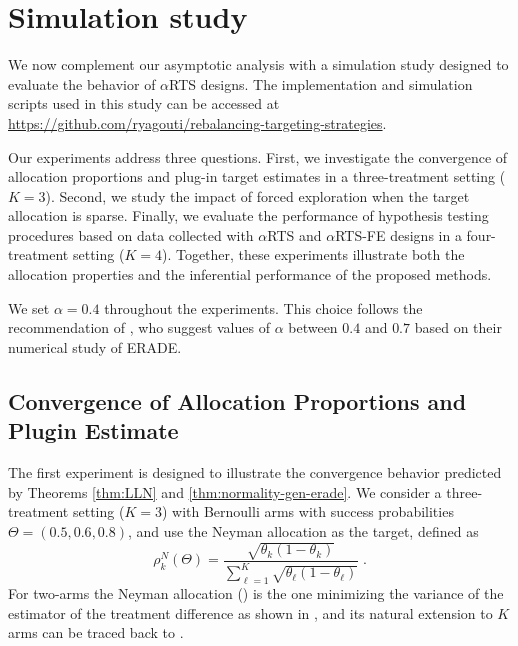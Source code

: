 \documentclass[11pt]{article}
\theoremstyle{plain}
\theoremstyle{definition}
\begin{document}
	
	\section{Simulation study}\label{sec:simulation}

We now complement our asymptotic analysis with a simulation study designed to evaluate the behavior of $\alpha$RTS designs. The implementation and simulation scripts used in this study can be accessed at \url{https://github.com/ryagouti/rebalancing-targeting-strategies}.

	Our experiments address three questions. First, we investigate the
	convergence of allocation proportions and plug-in target estimates in a
	three-treatment setting (\(K=3\)). Second, we study the impact of forced
	exploration when the target allocation is sparse. Finally, we evaluate the
	performance of hypothesis testing procedures based on data collected with
	\(\alpha\)RTS and \(\alpha\)RTS-FE designs in a four-treatment setting
	(\(K=4\)). Together, these experiments illustrate both the allocation
	properties and the inferential performance of the proposed methods.
	
	We set \(\alpha=0.4\) throughout the experiments. This choice follows the recommendation of \cite{hu2009efficient}, who suggest values of \(\alpha\) between \(0.4\) and \(0.7\)
	based on their numerical study of ERADE.

\subsection{Convergence of Allocation Proportions and Plugin Estimate}

The first experiment is designed to illustrate the convergence behavior predicted by Theorems \ref{thm:LLN} and \ref{thm:normality-gen-erade}. We consider a three-treatment setting (\(K=3\)) with Bernoulli arms with success probabilities $\Theta=(0.5, 0.6, 0.8)$, and use the Neyman allocation as the target, defined as
\[\rho_k^N(\Theta) = \frac{\sqrt{\theta_k(1-\theta_k)}}{\sum_{\ell=1}^{K}\sqrt{\theta_{\ell}(1-\theta_{\ell})}}\;.\]
For two-arms the Neyman allocation (\cite{neyman1934representative}) is the one minimizing the variance of the estimator of the treatment difference as shown in \cite{melfi1998variablility}, and its natural extension to $K$ arms can be traced back to \cite{Cochran1977}.
\end{document}
